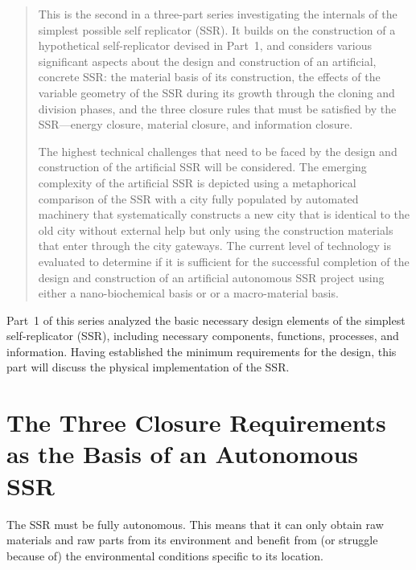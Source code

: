 
\begin{abstract}
This is the second in a three-part series investigating the internals 
of the simplest possible self replicator (SSR).  
It builds on the construction of a hypothetical self-replicator devised in 
Part~1, and considers various 
significant aspects about the
design and construction of an artificial, concrete SSR: the material
basis of its construction, the effects of the variable geometry of the
SSR during its growth through the cloning and division phases, and the
three closure rules that must be satisfied by the SSR---energy closure,
material closure, and information closure.

The highest technical
challenges that need to be faced by the design and construction of the
artificial SSR will be considered. The emerging complexity of the artificial
SSR is depicted using a metaphorical comparison of the SSR
with a city fully populated by automated machinery that
systematically constructs a new city that is identical
to the old city without external help but only using the
construction materials that enter through the city gateways. 
The current level of technology is evaluated to determine if it is sufficient for the successful completion of the design and construction of an artificial autonomous SSR project using either a nano-biochemical basis or or a macro-material basis.

\end{abstract}

Part~1 of this series analyzed the basic necessary design elements of the simplest self-replicator (SSR), 
including necessary components, functions, processes, and information.
Having established the minimum requirements for the design, this part will discuss the physical implementation
of the SSR.

\section{The Three Closure Requirements as the Basis of an Autonomous SSR}

The SSR must be fully autonomous. This means that it can only obtain raw
materials and raw parts from its environment and benefit from (or
struggle because of) the environmental conditions specific to its
location.

